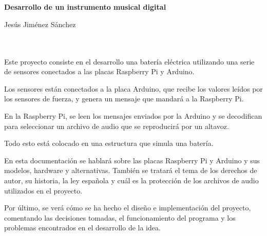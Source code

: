 
\chapter*{}   %

\cleardoublepage
\thispagestyle{empty}

\begin{center}
    {\large\bfseries Desarrollo de un instrumento musical digital}\\
\end{center}

\begin{center}
    Jesús Jiménez Sánchez\\
\end{center}

\\

\vspace{0.7cm}
\\

Este proyecto consiste en el desarrollo una batería eléctrica utilizando una serie de sensores conectados a las placas
Raspberry Pi y Arduino.

Los sensores están conectados a la placa Arduino, que recibe los valores leídos por los sensores de fuerza, y genera un
mensaje que mandará a la Raspberry Pi.

En la Raspberry Pi, se leen los mensajes enviados por la Arduino y se decodifican para seleccionar un archivo de audio
que se reproducirá por un altavoz.

Todo esto está colocado en una estructura que simula una batería.

En esta documentación se hablará sobre las placas Raspberry Pi y Arduino y sus modelos, hardware y alternativas. También
se tratará el tema de los derechos de autor, su historia, la ley española y cuál es la protección de los archivos de
audio utilizados en el proyecto.

Por último, se verá cómo se ha hecho el diseño e implementación del proyecto, comentando las decisiones tomadas, el
funcionamiento del programa y los problemas encontrados en el desarrollo de la idea.

